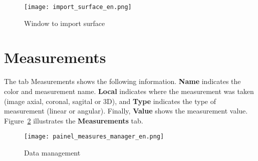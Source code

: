 \begin{figure}[!htb]
\centering
\texttt{[image: import\_surface\_en.png]}
\caption{Window to import surface}
\label{fig:import_surface}
\end{figure}

\newpage


\section{Measurements}

The tab Measurements shows the following information. \textbf{Name} indicates the color and measurement name. \textbf{Local} indicates where the measurement was taken (image axial, coronal, sagital or 3D), and \textbf{Type} indicates the type of measurement (linear or angular). Finally, \textbf{Value} shows the measurement value. Figure~\ref{fig:manager_mensuares} illustrates the \textbf{Measurements} tab.

\begin{figure}[!htb]
\centering
\texttt{[image: painel\_measures\_manager\_en.png]}
\caption{Data management}
\label{fig:manager_mensuares}
\end{figure}

